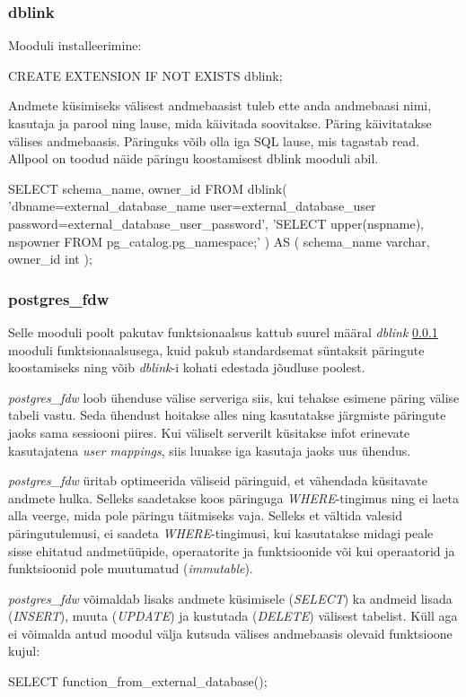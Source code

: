 \documentclass[a4paper,12pt]{article} %
\begin{document}
\subsubsection{dblink}
\label{dblink}
Mooduli installeerimine:
\begin{SQL}
CREATE EXTENSION IF NOT EXISTS dblink;
\end{SQL}
Andmete küsimiseks välisest andmebaasist tuleb ette anda andmebaasi nimi, kasutaja ja parool ning lause, mida käivitada soovitakse. Päring käivitatakse välises andmebaasis. Päringuks võib olla iga SQL lause, mis tagastab read.\cite{PostgreSQLdblink} Allpool on toodud näide päringu koostamisest dblink mooduli abil.
\begin{SQL}
SELECT schema_name, owner_id
FROM dblink(
  'dbname=external_database_name user=external_database_user password=external_database_user_password',
  'SELECT upper(nspname), nspowner FROM pg_catalog.pg_namespace;'
) AS (
  schema_name varchar,
  owner_id int
);
\end{SQL}

\subsubsection{postgres\_fdw}
Selle mooduli poolt pakutav funktsionaalsus kattub suurel määral \textit{dblink} \ref{dblink} mooduli funktsionaalsusega, kuid pakub standardsemat süntaksit päringute koostamiseks ning võib \textit{dblink}-i kohati edestada jõudluse poolest.\par
\textit{postgres\_fdw} loob ühenduse välise serveriga siis, kui tehakse esimene päring välise tabeli vastu. Seda ühendust hoitakse alles ning kasutatakse järgmiste päringute jaoks sama sessiooni piires. Kui väliselt serverilt küsitakse infot erinevate kasutajatena \textit{user mappings}, siis luuakse iga kasutaja jaoks uus ühendus.\par
\textit{postgres\_fdw} üritab optimeerida väliseid päringuid, et vähendada küsitavate andmete hulka. Selleks saadetakse koos päringuga \textit{WHERE}-tingimus ning ei laeta alla veerge, mida pole päringu täitmiseks vaja. Selleks et vältida valesid päringutulemusi, ei saadeta \textit{WHERE}-tingimusi, kui kasutatakse midagi peale sisse ehitatud andmetüüpide, operaatorite ja funktsioonide või kui operaatorid ja funktsioonid pole muutumatud (\textit{immutable}). \cite{PostgreSQLfdw}\par
\textit{postgres\_fdw} võimaldab lisaks andmete küsimisele (\textit{SELECT}) ka andmeid lisada (\textit{INSERT}), muuta (\textit{UPDATE}) ja kustutada (\textit{DELETE}) välisest tabelist. Küll aga ei võimalda antud moodul välja kutsuda välises andmebaasis olevaid funktsioone kujul:
\begin{SQL}
SELECT function_from_external_database();
\end{SQL}
\end{document}
